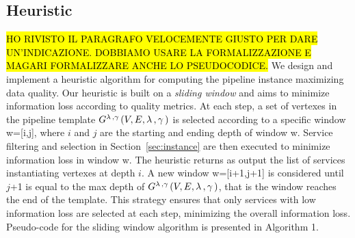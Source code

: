 \subsection{Heuristic}\label{subsec:heuristics}
\hl{HO RIVISTO IL PARAGRAFO VELOCEMENTE GIUSTO PER DARE UN'INDICAZIONE. DOBBIAMO USARE LA FORMALIZZAZIONE E MAGARI FORMALIZZARE ANCHE LO PSEUDOCODICE.} We design and implement a heuristic algorithm for computing the pipeline instance maximizing data quality. Our heuristic is built on a \emph{sliding window} and aims to minimize information loss according to quality metrics. At each step, a set of vertexes in the pipeline template $G^{\lambda\,,\gamma\,}(V,E,\lambda\,,\gamma\,)$ is selected according to a specific window w=[i,j], where $i$ and $j$ are the starting and ending depth of window w. Service filtering and selection in Section~\ref{sec:instance} are then executed to minimize information loss in window w. The heuristic returns as output the list of services instantiating vertexes at depth $i$. A new window w=[i+1,j+1] is considered until $j$+1 is equal to the max depth of $G^{\lambda\,,\gamma\,}(V,E,\lambda\,,\gamma\,)$, that is the window reaches the end of the template.
This strategy ensures that only services with low information loss are selected at each step, minimizing the overall information loss. Pseudo-code for the sliding window algorithm is presented in Algorithm 1.

